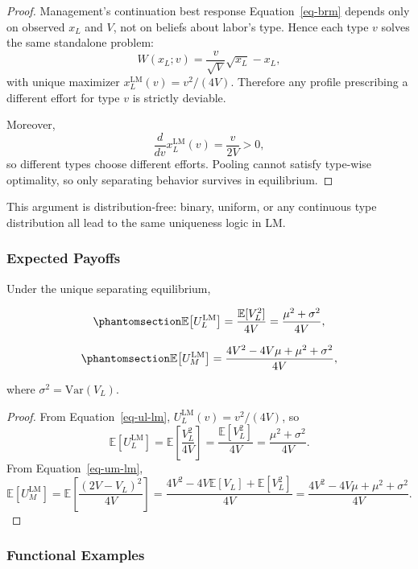 \documentclass[
  english,
  a4paper,
  12pt]{article}
\newcommand{\E}{\mathbb{E}}
\newcommand{\Var}{\mathrm{Var}}
\theoremstyle{plain}
\theoremstyle{plain}
\theoremstyle{definition}
\theoremstyle{remark}
\begin{document}
\begin{proof}
Management's continuation best response Equation~\ref{eq-brm} depends
only on observed \(x_L\) and \(V\), not on beliefs about labor's type.
Hence each type \(v\) solves the same standalone problem: \[
W(x_L;v)=\frac{v}{\sqrt V}\sqrt{x_L}-x_L,
\] with unique maximizer \(x_L^{\mathrm{LM}}(v)=v^2/(4V)\). Therefore
any profile prescribing a different effort for type \(v\) is strictly
deviable.

Moreover, \[
\frac{d}{dv}x_L^{\mathrm{LM}}(v)=\frac{v}{2V}>0,
\] so different types choose different efforts. Pooling cannot satisfy
type-wise optimality, so only separating behavior survives in
equilibrium.
\end{proof}

This argument is distribution-free: binary, uniform, or any continuous
type distribution all lead to the same uniqueness logic in LM.

\subsubsection{Expected Payoffs}\label{expected-payoffs}

Under the unique separating equilibrium,

\begin{equation}\phantomsection\label{eq-eul-lm}{
\E\!\left[U_L^{\mathrm{LM}}\right]
  = \frac{\E[V_L^2]}{4V}
  = \frac{\mu^2 + \sigma^2}{4V},
}\end{equation}

\begin{equation}\phantomsection\label{eq-eum-lm}{
\E\!\left[U_M^{\mathrm{LM}}\right]
  = \frac{4V^2 - 4V\mu + \mu^2 + \sigma^2}{4V},
}\end{equation}

where \(\sigma^2=\Var(V_L)\).

\begin{proof}
From Equation~\ref{eq-ul-lm}, \(U_L^{\mathrm{LM}}(v)=v^2/(4V)\), so \[
\E[U_L^{\mathrm{LM}}]
=\E\!\left[\frac{V_L^2}{4V}\right]
=\frac{\E[V_L^2]}{4V}
=\frac{\mu^2+\sigma^2}{4V}.
\] From Equation~\ref{eq-um-lm}, \[
\E[U_M^{\mathrm{LM}}]
=\E\!\left[\frac{(2V-V_L)^2}{4V}\right]
=\frac{4V^2-4V\E[V_L]+\E[V_L^2]}{4V}
=\frac{4V^2-4V\mu+\mu^2+\sigma^2}{4V}.
\]
\end{proof}

\subsubsection{Functional Examples}\label{sec-lm-examples}
\end{document}

